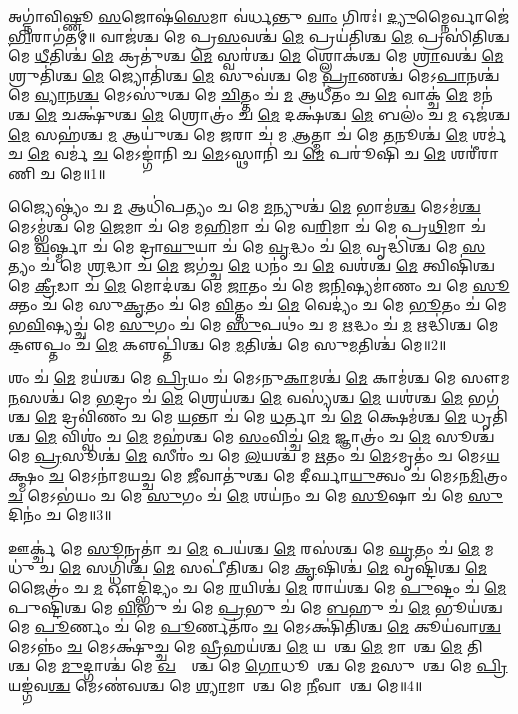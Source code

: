 

𑌅𑌗𑍍𑌨𑌾॑𑌵𑌿𑌷𑍍𑌣𑍂 \ul{𑌸}𑌜𑍋𑌷॑\ul{𑌸𑍇}𑌮𑌾 𑌵॑𑌰𑍍𑌧𑌨𑍍𑌤𑍁 \ul{𑌵𑌾𑌂} 𑌗𑌿𑌰𑌃॑। \ul{𑌦𑍍𑌯𑍁}𑌮𑍍𑌨𑍈𑌰𑍍𑌵𑌾𑌜𑍇॑\ul{𑌭𑌿}𑌰𑌾\-𑌗॑𑌤𑌮𑍍॥ 
𑌵𑌾𑌜॑𑌶𑍍𑌚 𑌮𑍇 𑌪𑍍𑌰\ul{𑌸}𑌵𑌶𑍍𑌚॑ \ul{𑌮𑍇} 𑌪𑍍𑌰𑌯॑𑌤𑌿𑌶𑍍𑌚 \ul{𑌮𑍇} 𑌪𑍍𑌰𑌸𑌿॑𑌤𑌿𑌶𑍍𑌚 𑌮𑍇 \ul{𑌧𑍀}𑌤𑌿𑌶𑍍𑌚॑ \ul{𑌮𑍇} 𑌕𑍍𑌰𑌤𑍁॑𑌶𑍍𑌚 \ul{𑌮𑍇} 𑌸𑍍𑌵𑌰॑𑌶𑍍𑌚 \ul{𑌮𑍇} 𑌶𑍍𑌲𑍋𑌕॑𑌶𑍍𑌚 𑌮𑍇 \ul{𑌶𑍍𑌰𑌾}𑌵𑌶𑍍𑌚॑ \ul{𑌮𑍇} 𑌶𑍍𑌰𑍁𑌤𑌿॑𑌶𑍍𑌚 \ul{𑌮𑍇} 𑌜𑍍𑌯𑍋𑌤𑌿॑𑌶𑍍𑌚 \ul{𑌮𑍇} 𑌸𑍁𑌵॑𑌶𑍍𑌚 𑌮𑍇 \ul{𑌪𑍍𑌰𑌾}𑌣𑌶𑍍𑌚॑ 𑌮𑍇𑌽\ul{𑌪𑌾}𑌨𑌶𑍍𑌚॑ 𑌮𑍇 \ul{𑌵𑍍𑌯𑌾}𑌨\ul{𑌶𑍍𑌚} 𑌮𑍇𑌽𑌸𑍁॑𑌶𑍍𑌚 𑌮𑍇 \ul{𑌚𑌿}𑌤𑍍𑌤𑌂 𑌚॑ \ul{𑌮} 𑌆𑌧𑍀॑𑌤𑌂 𑌚 \ul{𑌮𑍇} 𑌵𑌾𑌕𑍍𑌚॑ \ul{𑌮𑍇} 𑌮𑌨॑𑌶𑍍𑌚 \ul{𑌮𑍇} 𑌚𑌕𑍍𑌷𑍁॑𑌶𑍍𑌚 \ul{𑌮𑍇} 𑌶𑍍𑌰𑍋𑌤𑍍𑌰𑌂॑ 𑌚 \ul{𑌮𑍇} 𑌦𑌕𑍍𑌷॑𑌶𑍍𑌚 \ul{𑌮𑍇} 𑌬𑌲𑌂॑ 𑌚 \ul{𑌮} 𑌓𑌜॑𑌶𑍍𑌚 \ul{𑌮𑍇} 𑌸𑌹॑𑌶𑍍𑌚 \ul{𑌮} 𑌆𑌯𑍁॑𑌶𑍍𑌚 𑌮𑍇 \ul{𑌜}𑌰𑌾 𑌚॑ 𑌮 \ul{𑌆}𑌤𑍍𑌮𑌾 𑌚॑ 𑌮𑍇 \ul{𑌤}𑌨𑍂𑌶𑍍𑌚॑ \ul{𑌮𑍇} 𑌶𑌰𑍍𑌮॑ 𑌚 \ul{𑌮𑍇} 𑌵𑌰𑍍𑌮॑ \ul{𑌚} 𑌮𑍇𑌽𑌙𑍍𑌗𑌾॑𑌨𑌿 𑌚 \ul{𑌮𑍇}𑌽𑌸𑍍𑌥𑌾𑌨𑌿॑ 𑌚 \ul{𑌮𑍇} 𑌪𑌰𑍂॑𑌷𑌿 𑌚 \ul{𑌮𑍇} 𑌶𑌰𑍀॑𑌰𑌾𑌣𑌿 𑌚 𑌮𑍇॥1॥ 

𑌜𑍍𑌯𑍈𑌷𑍍𑌠𑍍𑌯𑌂॑ 𑌚 \ul{𑌮} 𑌆𑌧𑌿॑𑌪𑌤𑍍𑌯𑌂 𑌚 𑌮𑍇 \ul{𑌮}𑌨𑍍𑌯𑍁𑌶𑍍𑌚॑ \ul{𑌮𑍇} 𑌭𑌾𑌮॑\ul{𑌶𑍍𑌚} 𑌮𑍇𑌽𑌮॑\ul{𑌶𑍍𑌚} 𑌮𑍇𑌽𑌮𑍍𑌭॑𑌶𑍍𑌚 𑌮𑍇 \ul{𑌜𑍇}𑌮𑌾 𑌚॑ 𑌮𑍇 𑌮\ul{𑌹𑌿}𑌮𑌾 𑌚॑ 𑌮𑍇 𑌵\ul{𑌰𑌿}𑌮𑌾 𑌚॑ 𑌮𑍇 𑌪𑍍𑌰\ul{𑌥𑌿}𑌮𑌾 𑌚॑ 𑌮𑍇 \ul{𑌵}𑌰𑍍𑌷𑍍𑌮𑌾 𑌚॑ 𑌮𑍇 𑌦𑍍𑌰𑌾\ul{𑌘𑍁}𑌯𑌾 𑌚॑ 𑌮𑍇 \ul{𑌵𑍃}𑌦𑍍𑌧𑌂 𑌚॑ \ul{𑌮𑍇} 𑌵𑍃𑌦𑍍𑌧𑌿॑𑌶𑍍𑌚 𑌮𑍇 \ul{𑌸}𑌤𑍍𑌯𑌂 𑌚॑ 𑌮𑍇 \ul{𑌶𑍍𑌰}𑌦𑍍𑌧𑌾 𑌚॑ \ul{𑌮𑍇} 𑌜𑌗॑𑌚𑍍𑌚 \ul{𑌮𑍇} 𑌧𑌨𑌂॑ 𑌚 \ul{𑌮𑍇} 𑌵𑌶॑𑌶𑍍𑌚 \ul{𑌮𑍇} 𑌤𑍍𑌵𑌿𑌷𑌿॑𑌶𑍍𑌚 𑌮𑍇 \ul{𑌕𑍍𑌰𑍀}𑌡𑌾 𑌚॑ \ul{𑌮𑍇} 𑌮𑍋𑌦॑𑌶𑍍𑌚 𑌮𑍇 \ul{𑌜𑌾}𑌤𑌂 𑌚॑ 𑌮𑍇 𑌜\ul{𑌨𑌿}𑌷𑍍𑌯𑌮𑌾॑𑌣𑌂 𑌚 𑌮𑍇 \ul{𑌸𑍂}𑌕𑍍𑌤𑌂 𑌚॑ 𑌮𑍇 𑌸𑍁\ul{𑌕𑍃}𑌤𑌂 𑌚॑ 𑌮𑍇 \ul{𑌵𑌿}𑌤𑍍𑌤𑌂 𑌚॑ \ul{𑌮𑍇} 𑌵𑍇𑌦𑍍𑌯𑌂॑ 𑌚 𑌮𑍇 \ul{𑌭𑍂}𑌤𑌂 𑌚॑ 𑌮𑍇 𑌭\ul{𑌵𑌿}𑌷𑍍𑌯𑌚𑍍𑌚॑ 𑌮𑍇 \ul{𑌸𑍁}𑌗𑌂 𑌚॑ 𑌮𑍇 \ul{𑌸𑍁}𑌪𑌥𑌂॑ 𑌚 𑌮 \ul{𑌋}𑌦𑍍𑌧𑌂 𑌚॑ \ul{𑌮} 𑌋𑌦𑍍𑌧𑌿॑𑌶𑍍𑌚 𑌮𑍇 𑌕𑍢॒𑌪𑍍𑌤𑌂 𑌚॑ \ul{𑌮𑍇} 𑌕𑍢𑌪𑍍𑌤𑌿॑𑌶𑍍𑌚 𑌮𑍇 \ul{𑌮}𑌤𑌿𑌶𑍍𑌚॑ 𑌮𑍇 𑌸𑍁\ul{𑌮}𑌤𑌿𑌶𑍍𑌚॑ 𑌮𑍇॥2॥ 

𑌶𑌂 𑌚॑ \ul{𑌮𑍇} 𑌮𑌯॑𑌶𑍍𑌚 𑌮𑍇 \ul{𑌪𑍍𑌰𑌿}𑌯𑌂 𑌚॑ 𑌮𑍇𑌽𑌨𑍁\ul{𑌕𑌾}𑌮𑌶𑍍𑌚॑ \ul{𑌮𑍇} 𑌕𑌾𑌮॑𑌶𑍍𑌚 𑌮𑍇 𑌸𑍗𑌮\ul{𑌨}𑌸𑌶𑍍𑌚॑ 𑌮𑍇 \ul{𑌭}𑌦𑍍𑌰𑌂 𑌚॑ \ul{𑌮𑍇} 𑌶𑍍𑌰𑍇𑌯॑𑌶𑍍𑌚 \ul{𑌮𑍇} 𑌵𑌸𑍍𑌯॑𑌶𑍍𑌚 \ul{𑌮𑍇} 𑌯𑌶॑𑌶𑍍𑌚 \ul{𑌮𑍇} 𑌭𑌗॑𑌶𑍍𑌚 \ul{𑌮𑍇} 𑌦𑍍𑌰𑌵𑌿॑𑌣𑌂 𑌚 𑌮𑍇 \ul{𑌯}𑌨𑍍𑌤𑌾 𑌚॑ 𑌮𑍇 \ul{𑌧}𑌰𑍍𑌤𑌾 𑌚॑ \ul{𑌮𑍇} 𑌕𑍍𑌷𑍇𑌮॑𑌶𑍍𑌚 \ul{𑌮𑍇} 𑌧𑍃𑌤𑌿॑𑌶𑍍𑌚 \ul{𑌮𑍇} 𑌵𑌿𑌶𑍍𑌵𑌂॑ 𑌚 \ul{𑌮𑍇} 𑌮𑌹॑𑌶𑍍𑌚 𑌮𑍇 \ul{𑌸𑌂}𑌵𑌿𑌚𑍍𑌚॑ \ul{𑌮𑍇} 𑌜𑍍𑌞𑌾𑌤𑍍𑌰𑌂॑ 𑌚 \ul{𑌮𑍇} 𑌸𑍂𑌶𑍍𑌚॑ 𑌮𑍇 \ul{𑌪𑍍𑌰}𑌸𑍂𑌶𑍍𑌚॑ \ul{𑌮𑍇} 𑌸𑍀𑌰𑌂॑ 𑌚 𑌮𑍇 \ul{𑌲}𑌯𑌶𑍍𑌚॑ 𑌮 \ul{𑌋}𑌤𑌂 𑌚॑ \ul{𑌮𑍇}𑌽𑌮𑍃𑌤𑌂॑ 𑌚 𑌮𑍇𑌽\ul{𑌯}𑌕𑍍𑌷𑍍𑌮𑌂 \ul{𑌚} 𑌮𑍇𑌽𑌨𑌾॑𑌮𑌯𑌚𑍍𑌚 𑌮𑍇 \ul{𑌜𑍀}𑌵𑌾𑌤𑍁॑𑌶𑍍𑌚 𑌮𑍇 𑌦𑍀𑌰𑍍𑌘𑌾\ul{𑌯𑍁}𑌤𑍍𑌵𑌂 𑌚॑ 𑌮𑍇𑌽𑌨\ul{𑌮𑌿}𑌤𑍍𑌰𑌂 \ul{𑌚} 𑌮𑍇𑌽𑌭॑𑌯𑌂 𑌚 𑌮𑍇 \ul{𑌸𑍁}𑌗𑌂 𑌚॑ \ul{𑌮𑍇} 𑌶𑌯॑𑌨𑌂 𑌚 𑌮𑍇 \ul{𑌸𑍂}𑌷𑌾 𑌚॑ 𑌮𑍇 \ul{𑌸𑍁}𑌦𑌿𑌨𑌂॑ 𑌚 𑌮𑍇॥3॥ 

𑌊𑌰𑍍𑌕𑍍𑌚॑ 𑌮𑍇 \ul{𑌸𑍂}𑌨𑍃𑌤𑌾॑ 𑌚 \ul{𑌮𑍇} 𑌪𑌯॑𑌶𑍍𑌚 \ul{𑌮𑍇} 𑌰𑌸॑𑌶𑍍𑌚 𑌮𑍇 \ul{𑌘𑍃}𑌤𑌂 𑌚॑ \ul{𑌮𑍇} 𑌮𑌧𑍁॑ 𑌚 \ul{𑌮𑍇} 𑌸𑌗𑍍𑌧𑌿॑𑌶𑍍𑌚 \ul{𑌮𑍇} 𑌸𑌪𑍀॑𑌤𑌿𑌶𑍍𑌚 𑌮𑍇 \ul{𑌕𑍃}𑌷𑌿𑌶𑍍𑌚॑ \ul{𑌮𑍇} 𑌵𑍃𑌷𑍍𑌟𑌿॑𑌶𑍍𑌚 \ul{𑌮𑍇} 𑌜𑍈𑌤𑍍𑌰𑌂॑ 𑌚 \ul{𑌮} 𑌔𑌦𑍍𑌭𑌿॑𑌦𑍍𑌯𑌂 𑌚 𑌮𑍇 \ul{𑌰}𑌯𑌿𑌶𑍍𑌚॑ \ul{𑌮𑍇} 𑌰𑌾𑌯॑𑌶𑍍𑌚 𑌮𑍇 \ul{𑌪𑍁}𑌷𑍍𑌟𑌂 𑌚॑ \ul{𑌮𑍇} 𑌪𑍁𑌷𑍍𑌟𑌿॑𑌶𑍍𑌚 𑌮𑍇 \ul{𑌵𑌿}𑌭𑍁 𑌚॑ 𑌮𑍇 \ul{𑌪𑍍𑌰}𑌭𑍁 𑌚॑ 𑌮𑍇 \ul{𑌬}𑌹𑍁 𑌚॑ \ul{𑌮𑍇} 𑌭𑍂𑌯॑𑌶𑍍𑌚 𑌮𑍇 \ul{𑌪𑍂}𑌰𑍍𑌣𑌂 𑌚॑ 𑌮𑍇 \ul{𑌪𑍂}𑌰𑍍𑌣𑌤॑𑌰𑌂 \ul{𑌚} 𑌮𑍇𑌽𑌕𑍍𑌷𑌿॑𑌤𑌿𑌶𑍍𑌚 \ul{𑌮𑍇} 𑌕𑍂𑌯॑𑌵𑌾\ul{𑌶𑍍𑌚} 𑌮𑍇𑌽𑌨𑍍𑌨𑌂॑ \ul{𑌚} 𑌮𑍇𑌽𑌕𑍍𑌷𑍁॑𑌚𑍍𑌚 𑌮𑍇 \ul{𑌵𑍍𑌰𑍀}𑌹𑌯॑𑌶𑍍𑌚 \ul{𑌮𑍇} 𑌯𑌵𑌾᳚𑌶𑍍𑌚 \ul{𑌮𑍇} 𑌮𑌾𑌷𑌾᳚𑌶𑍍𑌚 \ul{𑌮𑍇} 𑌤𑌿𑌲𑌾᳚𑌶𑍍𑌚 𑌮𑍇 \ul{𑌮𑍁}𑌦𑍍𑌗𑌾𑌶𑍍𑌚॑ 𑌮𑍇 \ul{𑌖}𑌲𑍍𑌵𑌾᳚𑌶𑍍𑌚 𑌮𑍇 \ul{𑌗𑍋}𑌧𑍂𑌮𑌾᳚𑌶𑍍𑌚 𑌮𑍇 \ul{𑌮}𑌸𑍁𑌰𑌾᳚𑌶𑍍𑌚 𑌮𑍇 \ul{𑌪𑍍𑌰𑌿}𑌯𑌙𑍍𑌗॑𑌵\ul{𑌶𑍍𑌚} 𑌮𑍇𑌽𑌣॑𑌵𑌶𑍍𑌚 𑌮𑍇 \ul{𑌶𑍍𑌯𑌾}𑌮𑌾𑌕𑌾᳚𑌶𑍍𑌚 𑌮𑍇 \ul{𑌨𑍀}𑌵𑌾𑌰𑌾᳚𑌶𑍍𑌚 𑌮𑍇॥4॥ 

